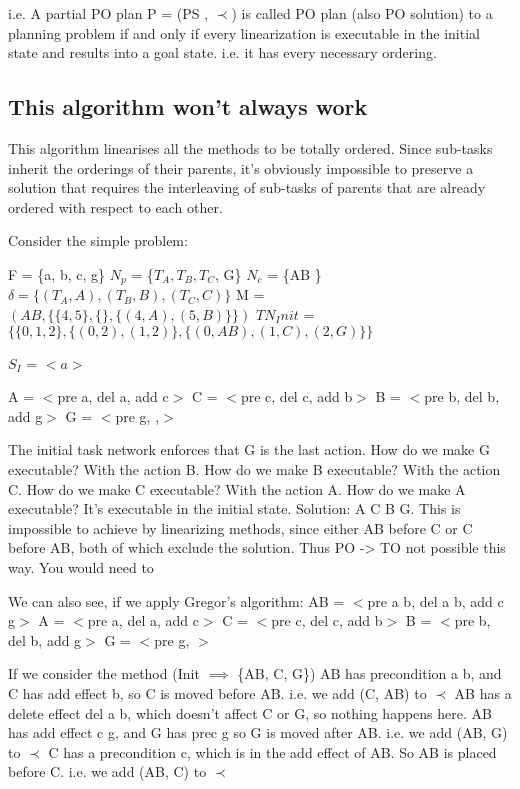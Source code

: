 i.e. A partial PO plan P = (PS , $\prec$) is called PO plan (also PO solution) to a planning problem if and only
if every linearization is executable in the initial state and results into a goal state.
i.e. it has every necessary ordering.



\subsection{This algorithm won't always work}
This algorithm linearises all the methods to be totally ordered.
Since sub-tasks inherit the orderings of their parents, it's obviously impossible to preserve a solution that requires the interleaving of sub-tasks of parents that are already ordered with respect to each other.

Consider the simple problem:

F = \{a, b, c, g\}
$N_p$ = \{$T_A, T_B, T_C$, G\}
$N_c$ = \{AB \}
$\delta = \{ (T_A, A), (T_B, B), (T_C, C) \}$
M = $(AB,  \{ \{4,5\}, \{\}, \{(4,A), (5,B)\} \} )$
$TN_Init$ = $\{ \{0,1,2\},  \{(0,2), (1,2)\}, \{(0,AB), (1,C), (2,G)\} \}$
	
	
$S_I$ = $<a>$
	
	A = $<$pre a, del a, add c$>$
	C = $<$pre c, del c, add b$>$
	B = $<$pre b, del b, add g$>$
	G = $<$pre g, ,$>$
	
	The initial task network enforces that G is the last action.
	How do we make G executable? With the action B.
	How do we make B executable? With the action C.
	How do we make C executable? With the action A.
	How do we make A executable? It's executable in the initial state.
	Solution: A C B G.
	This is impossible to achieve by linearizing methods, since either AB before C or C before AB, both of which exclude the solution.
	Thus PO -> TO not possible this way. You would need to 
	
	We can also see, if we apply Gregor's algorithm:
	AB = $<$pre a b, del a b, add c g$>$
	A = $<$pre a, del a, add c$>$
	C = $<$pre c, del c, add b$>$
	B = $<$pre b, del b, add g$>$
	G = $<$pre g, $>$
	
	If we consider the method (Init $\implies$ \{AB, C, G\})
	AB has precondition a b, and C has add effect b, so C is moved before AB.             i.e. we add (C, AB) to $\prec$
	AB has a delete effect del a b, which doesn't affect C or G, so nothing happens here.
	AB has add effect c g, and G has prec g so G is moved after AB.	                      i.e. we add (AB, G) to $\prec$
	C has a precondition c, which is in the add effect of AB.  So AB is placed before C.   i.e. we add (AB, C) to $\prec$
	
